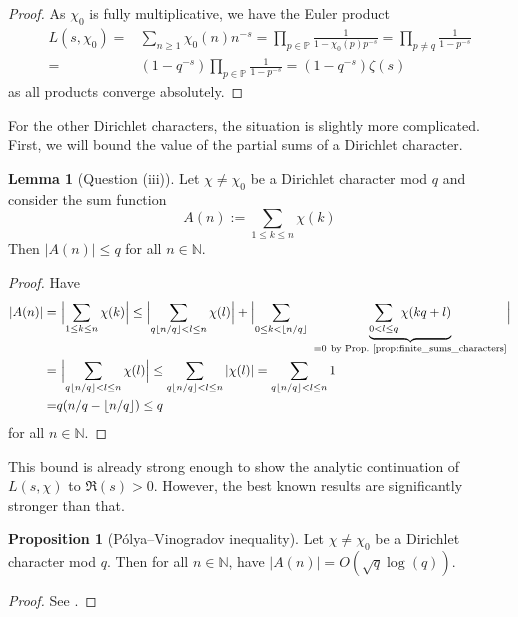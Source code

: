 \documentclass{scrartcl}
\newcommand{\primes}{\mathbb{P}}
\newcommand{\N}{\mathbb{N}}
\theoremstyle{definition}
\newtheorem{lemma}[definition]{Lemma}
\newtheorem{proposition}[definition]{Proposition}
\begin{document}
\begin{proof}
    As $\chi_0$ is fully multiplicative, we have the Euler product
    \begin{align*}
        L(s, \chi_0) =& \sum_{n \geq 1} \chi_0(n) n^{-s} = \prod_{p \in \primes} \frac 1 {1 - \chi_0(p)p^{-s}} = \prod_{p \neq q} \frac 1 {1 - p^{-s}} \\
        =& (1 - q^{-s}) \prod_{p \in \primes} \frac 1 {1 - p^{-s}} = (1 - q^{-s}) \zeta(s)
    \end{align*}
    as all products converge absolutely.
\end{proof}
For the other Dirichlet characters, the situation is slightly more complicated.
First, we will bound the value of the partial sums of a Dirichlet character.
\begin{lemma}[Question (iii)]
    \label{prop:bound_partsums_character}
    Let $\chi \neq \chi_0$ be a Dirichlet character mod $q$ and consider the sum function
    \begin{equation*}
        A(n) := \sum_{1 \leq k \leq n} \chi(k)
    \end{equation*}
    Then $|A(n)| \leq q$ for all $n \in \N$.
\end{lemma}
\begin{proof}
    Have
    \begin{align*}
        |A(n)| =& \ \Bigl| \sum_{1 \leq k \leq n} \chi(k) \Bigr| \leq \Bigl| \sum_{q\lfloor n/q \rfloor < l \leq n} \chi(l) \Bigr| + \Bigl| \sum_{0 \leq k < \lfloor n/q \rfloor} \ \underbrace{\sum_{0 < l \leq q} \chi(kq + l)}_{= 0 \ \text{by Prop.~\ref{prop:finite_sums_characters}}} \Bigr| \\
        =& \ \Bigl| \sum_{q\lfloor n/q \rfloor < l \leq n} \chi(l) \Bigr| \leq \sum_{q\lfloor n/q \rfloor < l \leq n} |\chi(l)| = \sum_{q\lfloor n/q \rfloor < l \leq n} 1 \\
        =& q(n/q - \lfloor n/q \rfloor) \leq q
    \end{align*}
    for all $n \in \N$.
\end{proof}
This bound is already strong enough to show the analytic continuation of $L(s, \chi)$ to $\Re(s) > 0$.
However, the best known results are significantly stronger than that.
\begin{proposition}[Pólya–Vinogradov inequality]
    Let $\chi \neq \chi_0$ be a Dirichlet character mod $q$. 
    Then for all $n \in \N$, have $|A(n)| = O(\sqrt{q}\log(q))$.
\end{proposition}
\begin{proof}
    See \cite[Ch. 23]{davenport}.
\end{proof}
\end{document}
